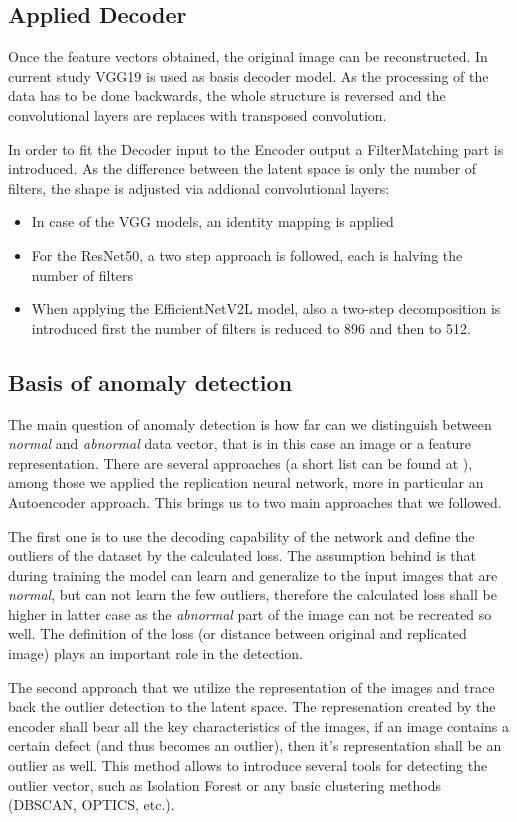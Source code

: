 \subsection{Applied Decoder}
Once the feature vectors obtained, the original image can be reconstructed.
In current study VGG19 is used as basis decoder model.
As the processing of the data has to be done backwards, the whole structure is
reversed and the convolutional layers are replaces with transposed convolution.

In order to fit the Decoder input to the Encoder output a FilterMatching part is introduced.
As the difference between the latent space is only the number of filters,
the shape is adjusted via addional convolutional layers:
\begin{itemize}
    \item In case of the VGG models, an identity mapping is applied
    \item For the ResNet50, a two step approach is followed, each is halving the number of filters
    \item When applying the EfficientNetV2L model, also a two-step decomposition is introduced
          first the number of filters is reduced to 896 and then to 512.
\end{itemize}

\subsection{Basis of anomaly detection}
The main question of anomaly detection is how far can we distinguish between \emph{normal}
and \emph{abnormal} data vector, that is in this case an image or a feature representation.
There are several approaches (a short list can be found at \cite{_anomaly_2023}), among those
we applied the replication neural network, more in particular an Autoencoder approach.
This brings us to two main approaches that we followed.

The first one is to use the decoding capability of the network and define the outliers of the
dataset by the calculated loss.
The assumption behind is that during training the model can learn and generalize to the input
images that are \emph{normal}, but can not learn the few outliers, therefore the calculated loss
shall be higher in latter case as the \emph{abnormal} part of the image can not be recreated so well.
The definition of the loss (or distance between original and replicated image) plays an important
role in the detection.

The second approach that we utilize the representation of the images and trace back the outlier
detection to the latent space.
The represenation created by the encoder shall bear all the key characteristics of the images,
if an image contains a certain defect (and thus becomes an outlier), then it's representation
shall be an outlier as well.
This method allows to introduce several tools for detecting the outlier vector,
such as Isolation Forest or any basic clustering methods (DBSCAN, OPTICS, etc.).

